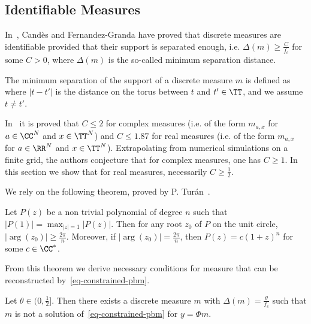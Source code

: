 \subsection{Identifiable Measures}

In~\cite{Candes-toward}, Cand\`es and Fernandez-Granda have proved that discrete
 measures are identifiable provided that their support is separated enough, i.e. $\Delta(m) \geq \frac{C}{f_c}$ for some $C>0$, where $\Delta(m)$ is the so-called minimum separation distance.

\begin{defn}
The minimum separation of the support of a discrete measure $m$ is defined as
where $|t-t'|$ is the distance on the torus between $t$ and $t'\in \TT$, and we assume $t\neq t'$.
\end{defn}

In~\cite{Candes-toward} it is proved that $C \leq 2$ for complex measures (i.e. of the form $m_{a,x}$ for $a \in \CC^N$ and $x \in \TT^N$) and $C \leq 1.87$ for real measures (i.e. of the form $m_{a,x}$ for $a \in \RR^N$ and $x \in \TT^N$). Extrapolating from numerical simulations on a finite grid, the authors conjecture that for complex measures, one has $C\geq 1$. In this section we show that for real measures, necessarily $C\geq \frac{1}{2}$.



We rely on the following theorem, proved by P. Tur\'an~\cite{Turan1946}.

\begin{thm}[Tur\'an]
Let $P(z)$ be a non trivial polynomial of degree $n$ such that $|P(1)|=\max_{|z|=1} |P(z)|$. Then for any root $z_0$ of $P$ on the unit circle, $|\arg (z_0)|\geq \frac{2\pi}{n}$. Moreover, if $|\arg (z_0)|= \frac{2\pi}{n}$, then $P(z)=c(1+z)^n$ for some $c\in \CC^*$.
 \label{thm-turan}
\end{thm}

From this theorem we derive necessary conditions for measure that can be reconstructed by~\eqref{eq-constrained-pbm}.

\begin{cor}
Let $\theta\in (0,\frac{1}{2}]$. Then there exists a discrete measure $m$ with $\Delta(m)=\frac{\theta}{f_c}$ such that $m$ is not a solution of~\eqref{eq-constrained-pbm} for $y=\Phi m$.
\end{cor}

